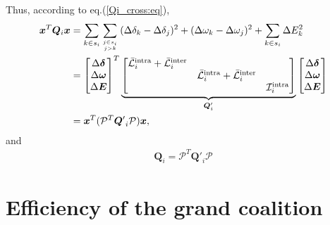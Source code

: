 \documentclass[12pt, draftclsnofoot,onecolumn]{IEEEtran}
\begin{document}
Thus, according to eq.(\ref{Qi_cross:eq}),
\begin{align}
{\boldsymbol x}^T{\boldsymbol Q}_i{\boldsymbol x} & = \sum_{k\in s_i}\sum_{j\in s_i \atop j>k}{(\Delta \delta_k-\Delta \delta_j)^2 +(\Delta \omega_k-\Delta \omega_j)^2} +\sum_{k\in s_i}{\Delta E_k^2} \nonumber\\
& = \begin{bmatrix}\Delta {\boldsymbol \delta}\\ \Delta {\boldsymbol \omega} \\ \Delta {\boldsymbol E}\end{bmatrix}^T
\underbrace{\begin{bmatrix}\bar {\mathcal L}_i^{\mathrm{intra}} + \bar {\mathcal L}_i^{\mathrm{inter}} & ~ &~\\
~& \bar {\mathcal L}_i^{\mathrm{intra}} + \bar {\mathcal L}_i^{\mathrm{inter}} & ~\\
~&~& \mathcal{I}_{i}^{\mathrm{intra}}\end{bmatrix} }_{{\boldsymbol Q}_i'}
\begin{bmatrix}\Delta {\boldsymbol \delta}\\ \Delta {\boldsymbol \omega} \\ \Delta {\boldsymbol E}\end{bmatrix}\nonumber\\
&={\boldsymbol x}^T({\mathcal P}^T{\boldsymbol Q'}_i{\mathcal P}){\boldsymbol x},
\end{align}
\noindent and
\begin{align}
{\boldsymbol Q}_i = {\mathcal P}^T{\boldsymbol Q'}_i{\mathcal P}
\end{align}



\section{Efficiency of the grand coalition}
\end{document}
